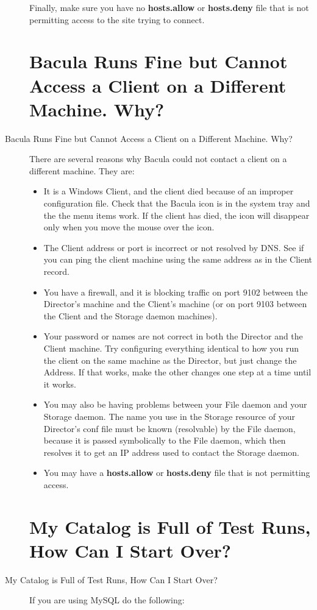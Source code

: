 \begin{description}
   Finally, make sure you have no {\bf hosts.allow} or {\bf hosts.deny}
   file that is not permitting access to the site trying to connect.

\label{AccessProblems}
\section{Bacula Runs Fine but Cannot Access a Client on a Different Machine.
   Why? }
\item [Bacula Runs Fine but Cannot Access a Client on a Different Machine.
   Why? ]
   There are several reasons why Bacula could not contact a client  on a
   different machine. They are:

\begin{itemize}
\item It is a Windows Client, and the client died because of an  improper
   configuration file. Check that the Bacula icon is in  the system tray and the
   the menu items work. If the client has  died, the icon will disappear only
   when you move the mouse over  the icon.
\item The Client address or port is incorrect or not resolved by  DNS. See if
   you can ping the client machine using the same  address as in the Client
   record.
\item You have a firewall, and it is blocking traffic on port  9102 between
   the Director's machine and the Client's  machine (or on port 9103 between the
   Client and the Storage daemon  machines).
\item Your password or names are not correct in both the Director and  the
   Client machine. Try configuring everything identical to  how you run the
   client on the same machine as the Director, but  just change the Address. If
   that works, make the other changes  one step at a time until it works.
\item You may also be having problems between your File daemon and your
   Storage daemon. The name you use in the Storage resource of your
   Director's conf file must be known (resolvable) by the File daemon,
   because it is passed symbolically to the File daemon, which then
   resolves it to get an IP address used to contact the Storage daemon.
\item You may have a {\bf hosts.allow} or {\bf hosts.deny} file that is
   not permitting access.
\end{itemize}

\label{startover}
\section{My Catalog is Full of Test Runs, How Can I Start Over?}
\item [My Catalog is Full of Test Runs, How Can I Start Over? ]
  If you are using MySQL do the following:


\end{description}
